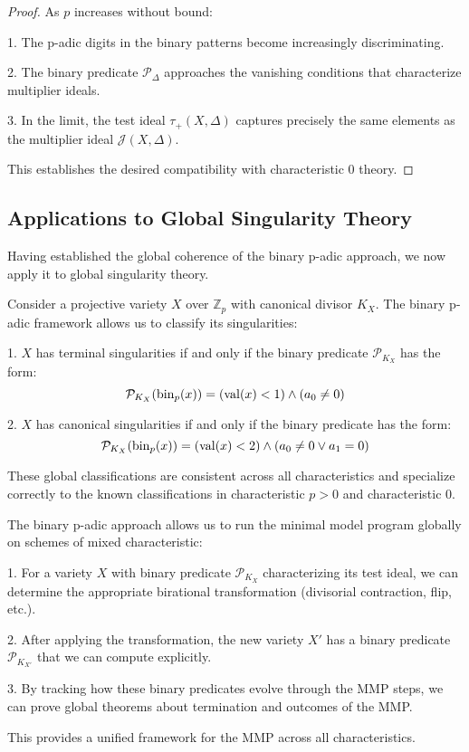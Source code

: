 \begin{proof}
As $p$ increases without bound:

1. The p-adic digits in the binary patterns become increasingly discriminating.

2. The binary predicate $\mathcal{P}_\Delta$ approaches the vanishing conditions that characterize multiplier ideals.

3. In the limit, the test ideal $\tau_+(X,\Delta)$ captures precisely the same elements as the multiplier ideal $\mathcal{J}(X,\Delta)$.

This establishes the desired compatibility with characteristic 0 theory.
\end{proof}

\subsection{Applications to Global Singularity Theory}

Having established the global coherence of the binary p-adic approach, we now apply it to global singularity theory.

\begin{example}\label{ex:global-classification}
Consider a projective variety $X$ over $\mathbb{Z}_p$ with canonical divisor $K_X$. The binary p-adic framework allows us to classify its singularities:

1. $X$ has terminal singularities if and only if the binary predicate $\mathcal{P}_{K_X}$ has the form:
$$\mathcal{P}_{K_X}(\operatorname{bin}_p(x)) = (\operatorname{val}(x) < 1) \wedge (a_0 \neq 0)$$

2. $X$ has canonical singularities if and only if the binary predicate has the form:
$$\mathcal{P}_{K_X}(\operatorname{bin}_p(x)) = (\operatorname{val}(x) < 2) \wedge (a_0 \neq 0 \vee a_1 = 0)$$

These global classifications are consistent across all characteristics and specialize correctly to the known classifications in characteristic $p > 0$ and characteristic 0.
\end{example}

\begin{example}\label{ex:global-mmp}
The binary p-adic approach allows us to run the minimal model program globally on schemes of mixed characteristic:

1. For a variety $X$ with binary predicate $\mathcal{P}_{K_X}$ characterizing its test ideal, we can determine the appropriate birational transformation (divisorial contraction, flip, etc.).

2. After applying the transformation, the new variety $X'$ has a binary predicate $\mathcal{P}_{K_{X'}}$ that we can compute explicitly.

3. By tracking how these binary predicates evolve through the MMP steps, we can prove global theorems about termination and outcomes of the MMP.

This provides a unified framework for the MMP across all characteristics.
\end{example}

